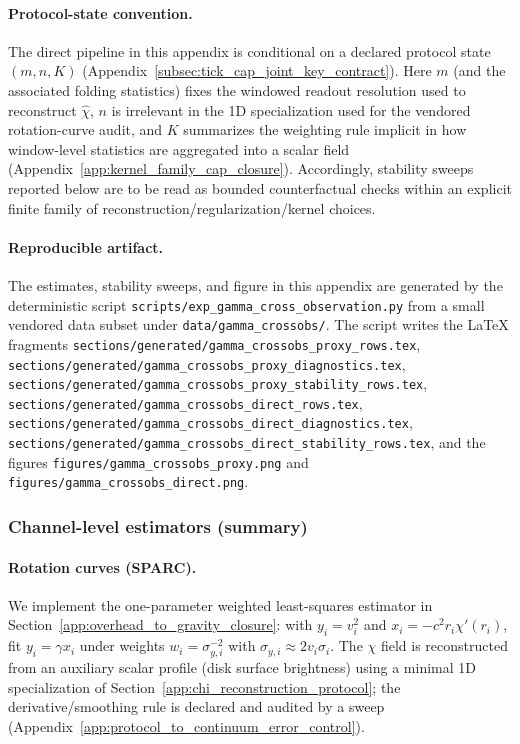 \paragraph{Protocol-state convention.}
\AuditTag The direct pipeline in this appendix is conditional on a declared protocol state $(m,n,K)$ (Appendix~\ref{subsec:tick_cap_joint_key_contract}).
Here $m$ (and the associated folding statistics) fixes the windowed readout resolution used to reconstruct $\widehat\chi$, $n$ is irrelevant in the 1D specialization used for the vendored rotation-curve audit, and $K$ summarizes the weighting rule implicit in how window-level statistics are aggregated into a scalar field (Appendix~\ref{app:kernel_family_cap_closure}).
Accordingly, stability sweeps reported below are to be read as bounded counterfactual checks within an explicit finite family of reconstruction/regularization/kernel choices.

\paragraph{Reproducible artifact.}
\AuditTag The estimates, stability sweeps, and figure in this appendix are generated by the deterministic script
\texttt{scripts/exp\_gamma\_cross\_observation.py} from a small vendored data subset under
\texttt{data/gamma\_crossobs/}. The script writes the LaTeX fragments
\texttt{sections/generated/gamma\_crossobs\_proxy\_rows.tex},
\texttt{sections/generated/gamma\_crossobs\_proxy\_diagnostics.tex},
\texttt{sections/generated/gamma\_crossobs\_proxy\_stability\_rows.tex},
\texttt{sections/generated/gamma\_crossobs\_direct\_rows.tex},
\texttt{sections/generated/gamma\_crossobs\_direct\_diagnostics.tex},
\texttt{sections/generated/gamma\_crossobs\_direct\_stability\_rows.tex},
and the figures
\texttt{figures/gamma\_crossobs\_proxy.png} and \texttt{figures/gamma\_crossobs\_direct.png}.

\FloatBarrier

\subsubsection[Channel-level estimators]{Channel-level estimators (summary)}
\label{subsec:gamma_crossobs_estimators}

\paragraph{Rotation curves (SPARC).}
\InterfaceTag We implement the one-parameter weighted least-squares estimator in Section~\ref{app:overhead_to_gravity_closure}:
with $y_i=v_i^2$ and $x_i=-c^2 r_i \chi'(r_i)$, fit $y_i=\gamma x_i$ under weights $w_i=\sigma_{y,i}^{-2}$
with $\sigma_{y,i}\approx 2v_i\sigma_i$.
The $\chi$ field is reconstructed from an auxiliary scalar profile (disk surface brightness) using a minimal 1D specialization
of Section~\ref{app:chi_reconstruction_protocol}; the derivative/smoothing rule is declared and audited by a sweep
(Appendix~\ref{app:protocol_to_continuum_error_control}).

